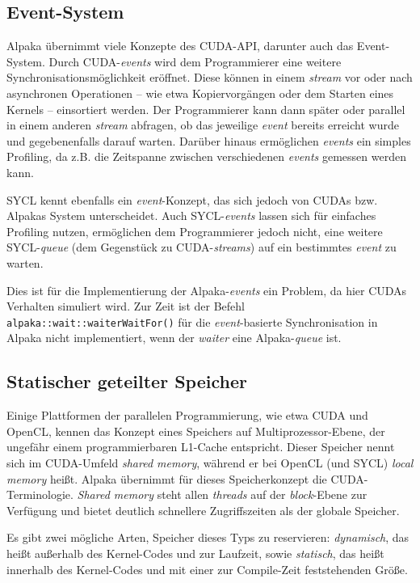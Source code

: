 \subsection{Event-System}\label{implementierung:probleme:events}

Alpaka übernimmt viele Konzepte des CUDA-API, darunter auch das Event-System.
Durch CUDA-\textit{events} wird dem Programmierer eine weitere
Synchronisationsmöglichkeit eröffnet. Diese können in einem \textit{stream} vor
oder nach asynchronen Operationen -- wie etwa Kopiervorgängen oder dem Starten
eines Kernels -- einsortiert werden. Der Programmierer kann dann später oder
parallel in einem anderen \textit{stream} abfragen, ob das jeweilige
\textit{event} bereits erreicht wurde und gegebenenfalls darauf warten. Darüber
hinaus ermöglichen \textit{events} ein simples Profiling, da z.B. die Zeitspanne
zwischen verschiedenen \textit{events} gemessen werden kann.

SYCL kennt ebenfalls ein \textit{event}-Konzept, das sich jedoch von CUDAs bzw.
Alpakas System unterscheidet. Auch SYCL-\textit{events} lassen sich für
einfaches Profiling nutzen, ermöglichen dem Programmierer jedoch nicht, eine
weitere SYCL-\textit{queue} (dem Gegenstück zu CUDA-\textit{streams}) auf ein
bestimmtes \textit{event} zu warten.

Dies ist für die Implementierung der Alpaka-\textit{events} ein Problem, da hier
CUDAs Verhalten simuliert wird. Zur Zeit ist der Befehl
\texttt{alpaka::wait::waiterWaitFor()} für die \textit{event}-basierte
Synchronisation in Alpaka nicht implementiert, wenn der \textit{waiter} eine
Alpaka-\textit{queue} ist.

\subsection{Statischer geteilter Speicher}
\label{implementierung:probleme:shared}

Einige Plattformen der parallelen Programmierung, wie etwa CUDA und OpenCL,
kennen das Konzept eines Speichers auf Multiprozessor-Ebene, der ungefähr
einem programmierbaren L1-Cache entspricht. Dieser Speicher nennt sich im
CUDA-Umfeld \textit{shared memory}, während er bei OpenCL (und SYCL)
\textit{local memory} heißt. Alpaka übernimmt für dieses Speicherkonzept die
CUDA-Terminologie. \textit{Shared memory} steht allen \textit{threads} auf
der \textit{block}-Ebene zur Verfügung und bietet deutlich schnellere
Zugriffszeiten als der globale Speicher.

Es gibt zwei mögliche Arten, Speicher dieses Typs zu reservieren:
\textit{dynamisch}, das heißt außerhalb des Kernel-Codes und zur Laufzeit, sowie
\textit{statisch}, das heißt innerhalb des Kernel-Codes und mit einer zur
Compile-Zeit feststehenden Größe.

